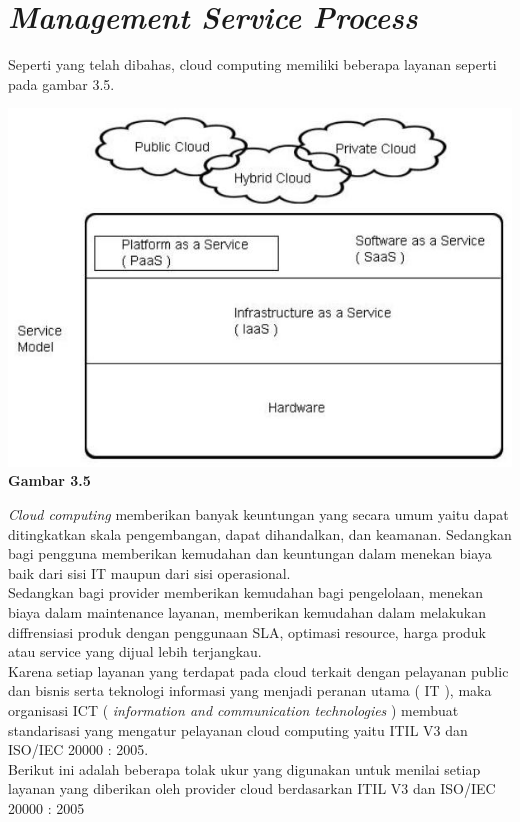 \section{\textit{Management Service Process}}
Seperti yang telah dibahas, cloud computing memiliki beberapa layanan seperti pada gambar 3.5.
\begin{center}
\includegraphics[scale=1]{Gambar35.jpg}\\
\textbf{Gambar 3.5}
\end{center}
\tab \textit{Cloud computing} memberikan banyak keuntungan yang secara umum yaitu dapat ditingkatkan skala pengembangan, dapat dihandalkan, dan keamanan. Sedangkan bagi pengguna memberikan kemudahan dan keuntungan dalam menekan biaya baik dari sisi IT maupun dari sisi operasional.\\
\tab Sedangkan bagi provider memberikan kemudahan bagi pengelolaan, menekan biaya dalam maintenance layanan, memberikan kemudahan dalam melakukan diffrensiasi produk dengan penggunaan SLA, optimasi resource, harga produk atau service yang dijual lebih terjangkau.\\
\tab Karena setiap layanan yang terdapat pada cloud terkait dengan pelayanan public dan bisnis serta teknologi informasi yang menjadi peranan utama ( IT ), maka organisasi ICT ( \textit{information and communication technologies} ) membuat standarisasi yang mengatur pelayanan cloud computing yaitu ITIL V3 dan ISO/IEC 20000 : 2005.\\
\tab Berikut ini adalah beberapa tolak ukur yang digunakan untuk menilai setiap layanan yang diberikan oleh provider cloud berdasarkan ITIL V3 dan ISO/IEC 20000 : 2005\\
